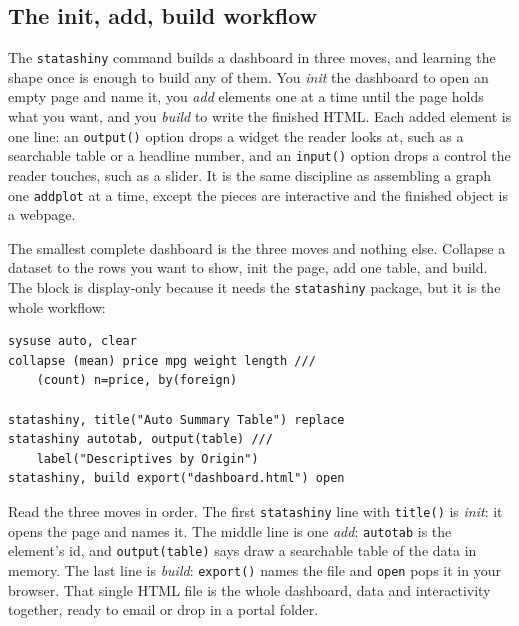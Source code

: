 \documentclass[
    a4paper,
    fontsize=10pt,
    twoside=true,
    numbers=noenddot,
]{kaobook}
\begin{document}
\subsection{The init, add, build workflow}
The \texttt{statashiny} command builds a dashboard in three moves, and learning the shape once is enough to build any of them. You \emph{init} the dashboard to open an empty page and name it, you \emph{add} elements one at a time until the page holds what you want, and you \emph{build} to write the finished HTML. Each added element is one line: an \texttt{output()} option drops a widget the reader looks at, such as a searchable table or a headline number, and an \texttt{input()} option drops a control the reader touches, such as a slider. It is the same discipline as assembling a graph one \texttt{addplot} at a time, except the pieces are interactive and the finished object is a webpage.

The smallest complete dashboard is the three moves and nothing else. Collapse a dataset to the rows you want to show, init the page, add one table, and build. The block is display-only because it needs the \texttt{statashiny} package, but it is the whole workflow:
{\footnotesize
\begin{verbatim}
sysuse auto, clear
collapse (mean) price mpg weight length ///
    (count) n=price, by(foreign)

statashiny, title("Auto Summary Table") replace
statashiny autotab, output(table) ///
    label("Descriptives by Origin")
statashiny, build export("dashboard.html") open
\end{verbatim}
}
Read the three moves in order. The first \texttt{statashiny} line with \texttt{title()} is \emph{init}: it opens the page and names it. The middle line is one \emph{add}: \texttt{autotab} is the element's id, and \texttt{output(table)} says draw a searchable table of the data in memory. The last line is \emph{build}: \texttt{export()} names the file and \texttt{open} pops it in your browser. That single HTML file is the whole dashboard, data and interactivity together, ready to email or drop in a portal folder.
\end{document}
